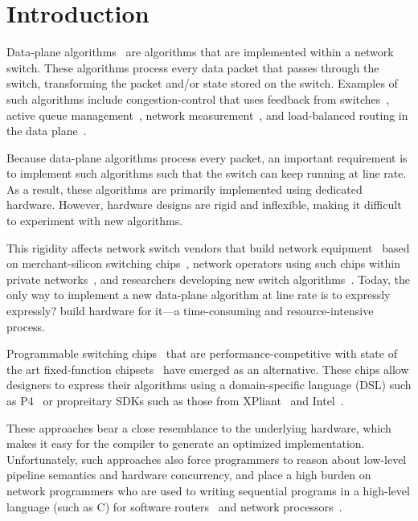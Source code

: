 \section{Introduction}
\label{s:intro}

Data-plane algorithms~\cite{cestan} are algorithms that are implemented within
a network switch. These algorithms process every data packet that passes
through the switch, transforming the packet and/or state stored on the switch.
Examples of such algorithms include congestion-control that uses feedback from
switches~\cite{xcp, rcp, pdq, dctcp}, active queue management~\cite{codel},
network measurement~\cite{opensketch, bitmap_george, elephant_george}, and
load-balanced routing in the data plane~\cite{conga}.

Because data-plane algorithms process every packet, an important requirement is
to implement such algorithms such that the switch can keep running at 
line rate.
As a result, these algorithms
are primarily implemented using dedicated hardware. However, hardware designs
are rigid and inflexible, making it difficult to experiment with new
algorithms.

This rigidity affects network switch vendors that build network
equipment~\cite{cisco_nexus, dell_force10, arista_7050} based on
merchant-silicon switching chips~\cite{trident, tomahawk, mellanox}, network
operators using such chips within private networks~\cite{google,facebook,vl2},
and researchers developing new switch algorithms~\cite{xcp, codel, d3, detail,
pdq}. Today, the only way to implement a new data-plane algorithm at line rate
is to expressly \ac{expressly?} build hardware for it---a time-consuming and resource-intensive
process.

Programmable switching chips~\cite{flexpipe, xpliant, rmt} that are
performance-competitive with state of the art fixed-function
chipsets~\cite{trident, tomahawk, mellanox} have emerged as an alternative.
These chips allow designers to express their algorithms using a domain-specific
language (DSL) such as P4~\cite{p4} or propreitary SDKs such as those from 
XPliant~\cite{xpliant_sdk, xpliant_sdk2} and Intel~\cite{intel_sdk}.

These approaches bear a close resemblance to the underlying hardware, 
which makes it easy for the compiler to generate an optimized implementation.
Unfortunately, such approaches also force
programmers to reason about low-level pipeline semantics and hardware
concurrency, and place a high burden on network programmers who are used to
writing sequential programs in a high-level language (such as C) for software
routers~\cite{click} and network processors~\cite{ixp4xx, ixp2800}.

